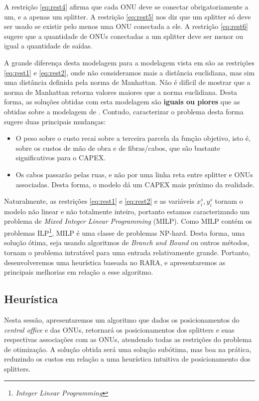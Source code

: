 \documentclass[12pt]{article}
\begin{document}
A restrição \ref{eq:rest4} afirma que cada ONU deve se conectar obrigatoriamente a um, e a apenas um splitter. A restrição \ref{eq:rest5} nos diz que um splitter só deve ser usado se existir pelo menos uma ONU conectada a ele. A restrição \ref{eq:rest6} sugere que a quantidade de ONUs conectadas a um splitter deve ser menor ou igual a quantidade de saídas.

A grande diferença desta modelagem para a modelagem vista em \cite{optpon} são as restrições \ref{eq:rest1} e \ref{eq:rest2}, onde não consideramos mais a distância euclidiana, mas sim uma distância definida pela norma de Manhattan. Não é difícil de mostrar que a norma de Manhattan retorna valores maiores que a norma euclidiana. Desta forma, as soluções obtidas com esta modelagem são \textbf{iguais ou piores} que as obtidas sobre a modelagem de \cite{optpon}. Contudo, caracterizar o problema desta forma sugere duas principais mudanças:
\begin{itemize}
  \item O peso sobre o custo recai sobre a terceira parcela da função objetivo, isto é, sobre os custos de mão de obra e de fibras/cabos, que são bastante significativos para o CAPEX.
  \item Os cabos passarão pelas ruas, e não por uma linha reta entre splitter e ONUs associadas. Desta forma, o modelo dá um CAPEX mais próximo da realidade.
\end{itemize}

Naturalmente, as restrições \ref{eq:rest1} e \ref{eq:rest2} e as variáveis $x_i^s, y_i^s$ tornam o modelo não linear e não totalmente inteiro, portanto estamos caracterizando um problema de \textit{Mixed Integer Linear Programming} (MILP). Como MILP contém os problemas ILP\footnote{\textit{Integer Linear Programming}}, MILP é uma classe de problemas NP-hard. Desta forma, uma solução ótima, seja usando algoritmos de \textit{Branch and Bound} ou outros métodos, tornam o problema intratável para uma entrada relativamente grande. Portanto, desenvolveremos uma heurística baseada no RARA, e apresentaremos as principais melhorias em relação a esse algoritmo.

\subsection{Heurística}
Nesta sessão, apresentaremos um algoritmo que dados os posicionamentos do \textit{central office} e das ONUs, retornará os posicionamentos dos splitters e suas respectivas associações com as ONUs, atendendo todas as restrições do problema de otimização. A solução obtida será uma solução subótima, mas boa na prática, reduzindo os custos em relação a uma heurística intuitiva de posicionamento dos splitters.
\end{document}
